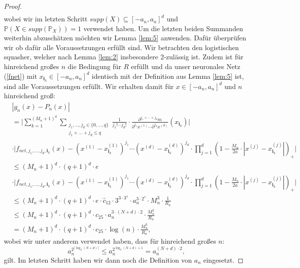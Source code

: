 \begin{proof}
\begin{equation}
\begin{split}
\end{split}
\end{equation}
wobei wir im letzten Schritt $supp(X) \subseteq [-a_n, a_n]^d$ und $\mathds{P}(X \in supp(\mathds{P}_X)) = 1$ verwendet haben. Um die letzten beiden Summanden weiterhin abzuschätzen möchten wir Lemma \ref{lem:5} anwenden. Dafür überprüfen wir ob dafür alle Voraussetzungen erfüllt sind. Wir betrachten den logistischen squasher, welcher nach Lemma \ref{lem:2} insbesondere 2-zulässig ist. Zudem ist für hinreichend großes $n$ die Bedingung für $R$ erfüllt und da unser neuronales Netz (\ref{fnet}) mit $x_{\mathbf{i}_k} \in [-a_n, a_n]^d$ identisch mit der Definition aus Lemma \ref{lem:5} ist, sind alle Voraussetzungen erfüllt. 
Wir erhalten damit für $x \in [-a_n ,a_n]^d$ und $n$ hinreichend groß:
\begin{equation}
\label{1stsum}
\begin{split}
& |g_n(x) - P_n(x)| \\
& = \bigg| \sum_{k = 1}^{(M_n + 1)^d} \sum_{\substack{ j_1,\dots,j_d \in \{0,\dots,q\} \\j_1+\dots +j_d \leq q}} \frac{1}{j_1! \cdots j_d!} \cdot \frac{\partial^{j_1+\cdots + j_d} m}{\partial^{j_1} x^{(1)}\cdots \partial^{j_d} x^{(d)}}(x_{\mathbf{i}_k}) \bigg| \\
& \cdot \bigg| f_{net,j_1,\dots,j_d,\mathbf{i}_k}(x) - (x^{(1)} - x_{\mathbf{i}_k}^{(1)})^{j_1} \cdots (x^{(d)} - x_{\mathbf{i}_k}^{(d)})^{j_d} \cdot \prod_{j = 1}^d(1 - \frac{M_n}{2a} \cdot |x^{(j)} - x_{\mathbf{i}_k}^{(j)}|)_+ \bigg| \\
& \leq (M_n + 1)^d \cdot (q + 1)^d \cdot e \\
& \cdot  \bigg| f_{net,j_1,\dots,j_d,\mathbf{i}_k}(x) - (x^{(1)} - x_{\mathbf{i}_k}^{(1)})^{j_1} \cdots (x^{(d)} - x_{\mathbf{i}_k}^{(d)})^{j_d} \cdot \prod_{j = 1}^d(1 - \frac{M_n}{2a} \cdot |x^{(j)} - x_{\mathbf{i}_k}^{(j)}|)_+ \bigg| \\
& \leq (M_n + 1)^d \cdot (q + 1)^d \cdot e \cdot \hat{c}_{12} \cdot 3^{3 \cdot 3^s} \cdot a_n^{3 \cdot 2^s} \cdot M_n^3 \cdot \frac{1}{R_n} \\
& \leq (M_n + 1)^d \cdot (q + 1)^d \cdot c_{25}\cdot a_n^{3 \cdot (N + d) \cdot 2} \cdot \frac{M_n^3}{R_n} \\
& =  (M_n + 1)^d \cdot (q + 1)^d \cdot c_{25}\cdot \log(n) \cdot \frac{M_n^3}{R_n},
\end{split}
\end{equation}
wobei wir unter anderem verwendet haben, dass für hinreichend großes $n$:
$$a_n^{2^{\lceil\log_2(N + d)\rceil}} \leq a_n^{2^{\log_2(N + d) + 1}} = a_n^{(N + d) \cdot 2},$$ gilt. Im letzten Schritt haben wir dann noch die Definition von $a_n$ eingesetzt. 

\end{proof}
